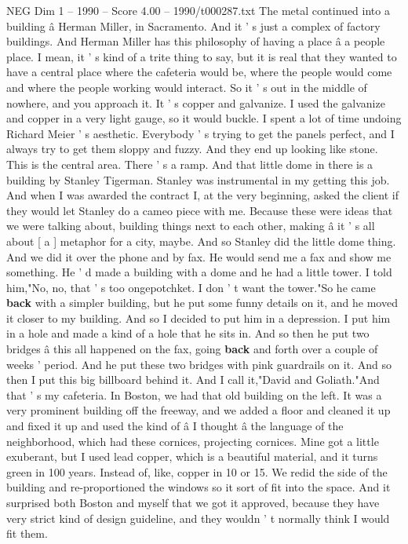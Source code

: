 \begin{textsample}{NEG Dim 1 – 1990 – Score 4.00 – 1990/t000287.txt}
The metal continued into a building â Herman Miller, in Sacramento.
And it ' s just a complex of factory buildings.
And Herman Miller has this philosophy of having a place â a people place.
I mean, it ' s kind of a trite thing to say, but it is real that they wanted to have a central place where the cafeteria would be, where the people would come and where the people working would interact.
So it ' s out in the middle of nowhere, and you approach it.
It ' s copper and galvanize.
I used the galvanize and copper in a very light gauge, so it would buckle.
I spent a lot of time undoing Richard Meier ' s aesthetic.
Everybody ' s trying to get the panels perfect, and I always try to get them sloppy and fuzzy.
And they end up looking like stone.
This is the central area.
There ' s a ramp.
And that little dome in there is a building by Stanley Tigerman.
Stanley was instrumental in my getting this job.
And when I was awarded the contract I, at the very beginning, asked the client if they would let Stanley do a cameo piece with me.
Because these were ideas that we were talking about, building things next to each other, making â it ' s all about [ a ] metaphor for a city, maybe.
And so Stanley did the little dome thing.
And we did it over the phone and by fax.
He would send me a fax and show me something.
He ' d made a building with a dome and he had a little tower.
I told him,"No, no, that ' s too ongepotchket.
I don ' t want the tower."So he came \textbf{back} with a simpler building, but he put some funny details on it, and he moved it closer to my building.
And so I decided to put him in a depression.
I put him in a hole and made a kind of a hole that he sits in.
And so then he put two bridges â this all happened on the fax, going \textbf{back} and forth over a couple of weeks ' period.
And he put these two bridges with pink guardrails on it.
And so then I put this big billboard behind it.
And I call it,"David and Goliath."And that ' s my cafeteria.
In Boston, we had that old building on the left.
It was a very prominent building off the freeway, and we added a floor and cleaned it up and fixed it up and used the kind of â I thought â the language of the neighborhood, which had these cornices, projecting cornices.
Mine got a little exuberant, but I used lead copper, which is a beautiful material, and it turns green in 100 years.
Instead of, like, copper in 10 or 15.
We redid the side of the building and re-proportioned the windows so it sort of fit into the space.
And it surprised both Boston and myself that we got it approved, because they have very strict kind of design guideline, and they wouldn ' t normally think I would fit them.

\end{textsample}

